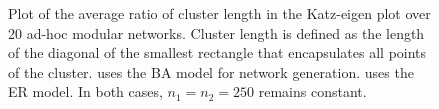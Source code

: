 \documentclass{IEEEtran}
\begin{document}
	\begin{figure}
		\centering
		\caption{Plot of the average ratio of cluster length in the Katz-eigen plot over 20 ad-hoc modular networks. Cluster length is defined as the length of the diagonal of the smallest rectangle that encapsulates all points of the cluster.  uses the BA model for network generation.  uses the ER model. In both cases, $n_1=n_2=250$ remains constant.}
		\label{fig:length}
	\end{figure}
\end{document}
